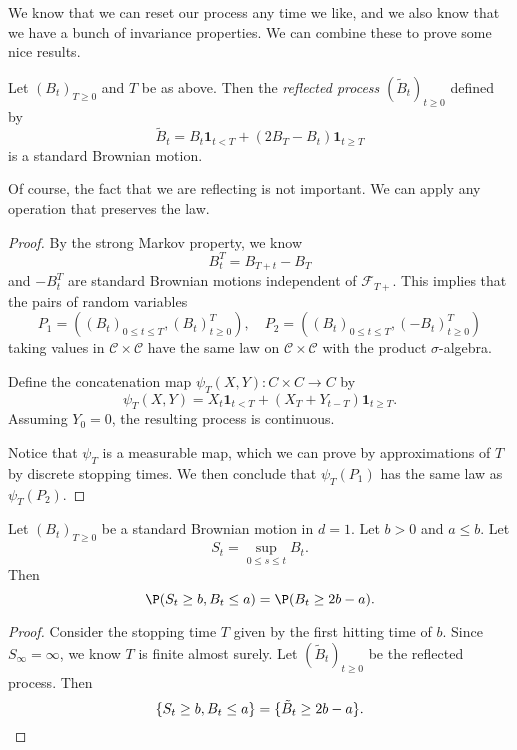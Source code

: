 \documentclass[a4paper]{article}
\begin{document}
We know that we can reset our process any time we like, and we also know that we have a bunch of invariance properties. We can combine these to prove some nice results.

\begin{thm}
  Let $(B_t)_{T \geq 0}$ and $T$ be as above. Then the \emph{reflected process} $(\tilde{B}_t)_{t \geq 0}$ defined by
  \[
    \tilde{B}_t = B_t \mathbf{1}_{t < T} + (2 B_T - B_t)\mathbf{1}_{t \geq T}
  \]
  is a standard Brownian motion.
\end{thm}
Of course, the fact that we are reflecting is not important. We can apply any operation that preserves the law.

\begin{proof}
  By the strong Markov property, we know
  \[
    B^T_t = B_{T + t} - B_T
  \]
  and $-B_t^T$ are standard Brownian motions independent of $\mathcal{F}_{T+}$. This implies that the pairs of random variables
  \[
    P_1 = ((B_t)_{0 \leq t \leq T}, (B_t)^T_{t \geq 0}),\quad P_2 = ((B_t)_{0 \leq t \leq T}, (-B_t)^T_{t \geq 0})
  \]
  taking values in $\mathcal{C} \times \mathcal{C}$ have the same law on $\mathcal{C} \times \mathcal{C}$ with the product $\sigma$-algebra.

  Define the concatenation map $\psi_T(X, Y): C \times C \to C$ by
  \[
    \psi_T(X, Y) = X_t \mathbf{1}_{t < T} + (X_T + Y_{t - T}) \mathbf{1}_{t \geq T}.
  \]
  Assuming $Y_0 = 0$, the resulting process is continuous.

  Notice that $\psi_T$ is a measurable map, which we can prove by approximations of $T$ by discrete stopping times. We then conclude that $\psi_T(P_1)$ has the same law as $\psi_T(P_2)$.
\end{proof}

\begin{cor}
  Let $(B_t)_{T \geq 0}$ be a standard Brownian motion in $d = 1$. Let $b > 0$ and $a \leq b$. Let
  \[
    S_t = \sup_{0 \leq s \leq t} B_t.
  \]
  Then
  \[
    \P(S_t \geq b, B_t \leq a) = \P(B_t \geq 2b - a).
  \]
\end{cor}

\begin{proof}
  Consider the stopping time $T$ given by the first hitting time of $b$. Since $S_\infty = \infty$, we know $T$ is finite almost surely. Let $(\tilde{B}_t)_{t\geq 0}$ be the reflected process. Then
  \[
    \{S_t \geq b, B_t \leq a\} = \{\tilde{B}_t \geq 2b - a \}.\qedhere
  \]
\end{proof}
\end{document}
